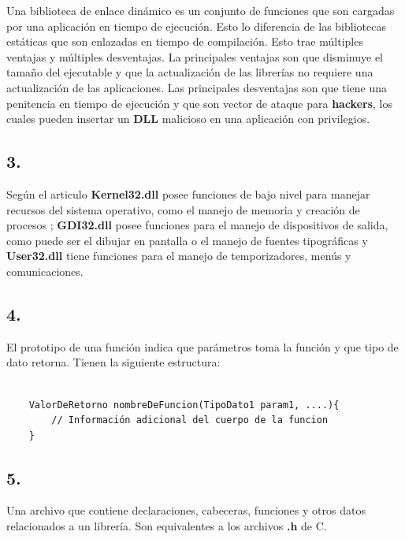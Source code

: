 Una biblioteca de enlace dinámico es un conjunto de funciones que son cargadas
por una aplicación en tiempo de ejecución. Esto lo diferencia de las
bibliotecas estáticas que son enlazadas en tiempo de compilación. Esto trae
múltiples ventajas y múltiples desventajas. La principales ventajas son que
disminuye el tamaño del ejecutable y que la actualización de las librerías no
requiere una actualización de las aplicaciones. Las principales desventajas son
que tiene una penitencia en tiempo de ejecución y que son vector de ataque para
\textbf{hackers}, los cuales pueden insertar un \textbf{DLL} malicioso en una
aplicación con privilegios.

\subsection*{3.}

Según el articulo \cite{MicrosoftDLL} \textbf{Kernel32.dll} posee funciones
de bajo nivel para manejar recursos del sistema operativo, como el manejo
de memoria y creación de procesos ; \textbf{GDI32.dll} posee funciones para
el manejo de dispositivos de salida, como puede ser el dibujar en pantalla
o el manejo de fuentes tipográficas y  \textbf{User32.dll} tiene funciones para
el manejo de temporizadores, menús y comunicaciones.

\subsection*{4.}

El prototipo de una función indica que parámetros toma la función y que tipo
de dato retorna. Tienen la siguiente estructura:

\begin{center}
\begin{BVerbatim}

    ValorDeRetorno nombreDeFuncion(TipoDato1 param1, ....){
        // Información adicional del cuerpo de la funcion
    }
\end{BVerbatim}
\end{center}

\subsection*{5.}

Una archivo que contiene declaraciones, cabeceras, funciones y otros
datos relacionados a un librería. Son equivalentes a los archivos \textbf{.h}
de C.

